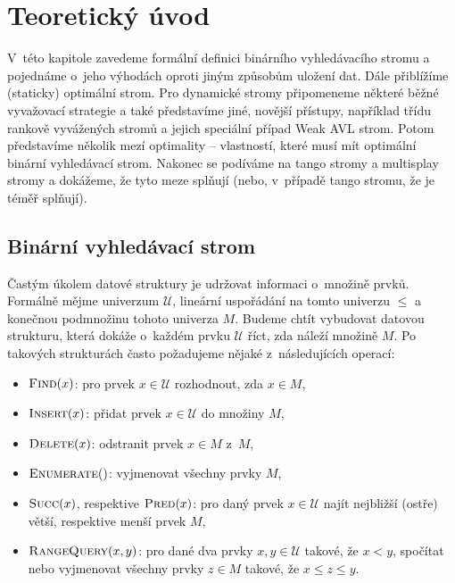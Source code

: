 \def\maybetext{\ifmmode\noexpand\hbox\fi}
\def\ope#1{\maybetext{{\sc#1}}}

\chapter{Teoretický úvod}

V~této kapitole zavedeme formální definici binárního vyhledávacího stromu a
pojednáme o~jeho výhodách oproti jiným způsobům uložení dat. Dále přiblížíme
(staticky) optimální strom. Pro dynamické stromy připomeneme některé běžné
vyvažovací strategie a také představíme jiné, novější přístupy, například třídu
rankově vyvážených stromů a jejich speciální případ Weak AVL strom. Potom
představíme několik mezí optimality -- vlastností, které musí mít optimální
binární vyhledávací strom. Nakonec se podíváme na tango stromy a multisplay
stromy a dokážeme, že tyto meze splňují (nebo, v~případě tango stromu, že je
téměř splňují).

\section{Binární vyhledávací strom}
\def\U{\mathcal U}
\def\o{\mathcal O}
\let\op\operatorname

Častým úkolem datové struktury je udržovat informaci o~množině prvků. Formálně
mějme univerzum $\mathcal U$, lineární uspořádání na tomto univerzu $\leq$ a
konečnou podmnožinu tohoto univerza $M$. Budeme chtít vybudovat datovou strukturu, která dokáže
o~každém prvku $\mathcal U$ říct, zda náleží množině $M$. Po takových
strukturách často požadujeme nějaké z~následujících operací:

\begin{itemize}
\item $\ope{Find}(x)$: pro prvek $x \in \U$ rozhodnout, zda $x\in M$,
\item $\ope{Insert}(x)$: přidat prvek $x \in \U$ do množiny $M$,
\item $\ope{Delete}(x)$: odstranit prvek $x\in M$ z~$M$,
\item $\ope{Enumerate}()$: vyjmenovat všechny prvky $M$,
\item $\ope{Succ}(x)$, respektive $\ope{Pred}(x)$: pro daný prvek $x\in \U $ najít nejbližší (ostře) větší, respektive menší prvek $M$,
\item $\ope{RangeQuery}(x,y)$: pro dané dva prvky $x,y\in\U$ takové, že $x<y$, spočítat nebo vyjmenovat všechny prvky $z\in M$ takové, že $x \leq z \leq y$.
\end{itemize}

